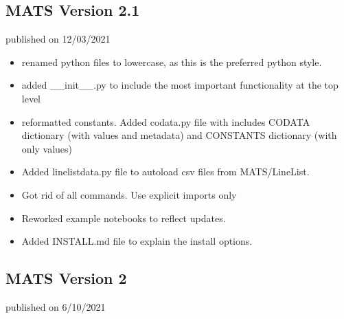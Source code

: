 \documentclass[letterpaper,10pt,english]{sphinxmanual}
\begin{document}
\subsection{MATS Version 2.1}
\label{\detokenize{MATS Version Summary:mats-version-2-1}}
\sphinxAtStartPar
published on 12/03/2021

\sphinxAtStartPar
{}
\begin{itemize}
\item {} 
\sphinxAtStartPar
renamed python files to lowercase, as this is the preferred python style.

\item {} 
\sphinxAtStartPar
added \_\_init\_\_.py to include the most important functionality at the top level

\item {} 
\sphinxAtStartPar
reformatted constants.  Added codata.py file with includes CODATA dictionary (with values and metadata) and CONSTANTS dictionary (with only values)

\item {} 
\sphinxAtStartPar
Added linelistdata.py file to autoload csv files from MATS/LineList.

\item {} 
\sphinxAtStartPar
Got rid of all  commands.  Use explicit imports only

\item {} 
\sphinxAtStartPar
Reworked example notebooks to reflect updates.

\item {} 
\sphinxAtStartPar
Added INSTALL.md file to explain the install options.

\end{itemize}


\subsection{MATS Version 2}
\label{\detokenize{MATS Version Summary:mats-version-2}}
\sphinxAtStartPar
published on 6/10/2021
\end{document}
